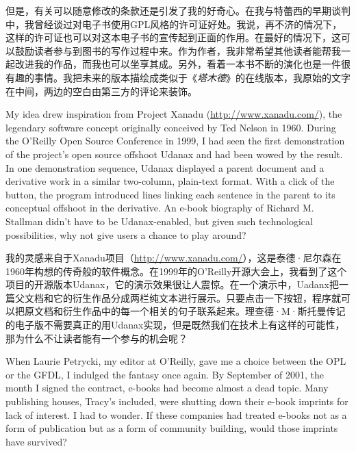 \ifdefined\chs
但是，有关可以随意修改的条款还是引发了我的好奇心。在我与特蕾西的早期谈判中，我曾经谈过对电子书使用GPL风格的许可证好处。我说，再不济的情况下，这样的许可证也可以对这本电子书的宣传起到正面的作用。在最好的情况下，这可以鼓励读者参与到图书的写作过程中来。作为作者，我非常希望其他读者能帮我一起改进我的作品，而我也可以坐享其成。另外，看着一本书不断的演化也是一件很有趣的事情。我把未来的版本描绘成类似于《\textit{塔木德}》的在线版本，我原始的文字在中间，两边的空白由第三方的评论来装饰。
\fi

\ifdefined\eng
My idea drew inspiration from Project Xanadu (\url{http://www.xanadu.com/}), the legendary software concept originally conceived by Ted Nelson in 1960. During the O'Reilly Open Source Conference in 1999, I had seen the first demonstration of the project's open source offshoot Udanax and had been wowed by the result. In one demonstration sequence, Udanax displayed a parent document and a derivative work in a similar two-column, plain-text format. With a click of the button, the program introduced lines linking each sentence in the parent to its conceptual offshoot in the derivative. An e-book biography of Richard M. Stallman didn't have to be Udanax-enabled, but given such technological possibilities, why not give users a chance to play around?
\fi

\ifdefined\chs
我的灵感来自于Xanadu项目（\url{http://www.xanadu.com/}），这是泰德·尼尔森在1960年构想的传奇般的软件概念。在1999年的O'Reilly开源大会上，我看到了这个项目的开源版本Udanax，它的演示效果很让人震惊。在一个演示中，Uadanx把一篇父文档和它的衍生作品分成两栏纯文本进行展示。只要点击一下按钮，程序就可以把原文档和衍生作品中的每一个相关的句子联系起来。理查德·M·斯托曼传记的电子版不需要真正的用Udanax实现，但是既然我们在技术上有这样的可能性，那为什么不让读者能有一个参与的机会呢？
\fi

\ifdefined\eng
When Laurie Petrycki, my editor at O'Reilly, gave me a choice between the OPL or the GFDL, I indulged the fantasy once again. By September of 2001, the month I signed the contract, e-books had become almost a dead topic. Many publishing houses, Tracy's included, were shutting down their e-book imprints for lack of interest. I had to wonder. If these companies had treated e-books not as a form of publication but as a form of community building, would those imprints have survived?
\fi

